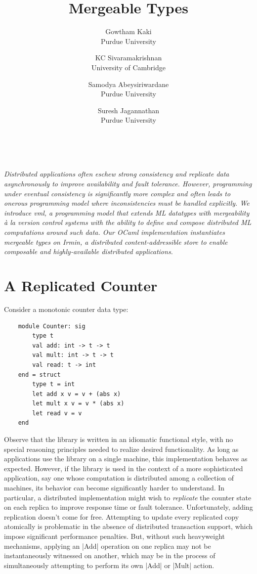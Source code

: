 \documentclass[twocolumn,9pt]{extarticle}
\title{{\bf Mergeable Types}}
\author{Gowtham Kaki \\
        Purdue University
        \and
				KC Sivaramakrishnan \\
        University of Cambridge
				\and
				Samodya Abeysiriwardane \\
				Purdue University\\
                                \and
                              	Suresh Jagannathan \\
				Purdue University}
\date{~}
\newcommand{\name}{{\sc vml}\xspace}
\begin{document}
\maketitle

\emph{
	Distributed applications often eschew strong consistency and replicate data
	asynchronously to improve availability and fault tolerance. However,
	programming under eventual consistency is significantly more complex and
	often leads to onerous programming model where inconsistencies must be
	handled explicitly. We introduce \name, a programming model that extends ML
	datatypes with mergeability \`{a} la version control systems with the ability
	to define and compose distributed ML computations around such data. Our OCaml
	implementation instantiates mergeable types on Irmin, a distributed
	content-addressible store to enable composable and highly-available
	distributed applications.
}

\section{A Replicated Counter}

Consider a monotonic counter data type:

\begin{lstlisting}
	module Counter: sig
		type t
		val add: int -> t -> t
		val mult: int -> t -> t
		val read: t -> int
	end = struct
		type t = int
		let add x v = v + (abs x)
		let mult x v = v * (abs x)
		let read v = v
	end
\end{lstlisting}

Observe that the library is written in an idiomatic functional style, with no
special reasoning principles needed to realize desired functionality. As long
as applications use the library on a single machine, this implementation
behaves as expected.  However, if the library is used in the context of a more
sophisticated application, say one whose computation is distributed among a
collection of machines, its behavior can become significantly harder to
understand.  In particular, a distributed implementation might wish to
\emph{replicate} the counter state on each replica to improve response time or
fault tolerance.  Unfortunately, adding replication doesn't come for free.
Attempting to update every replicated copy atomically is problematic in the
absence of distributed transaction support, which impose significant
performance penalties.  But, without such heavyweight mechanisms, applying an
|Add| operation on one replica may not be instantaneously witnessed on another,
which may be in the process of simultaneously attempting to perform its own
|Add| or |Mult| action.
\end{document}
